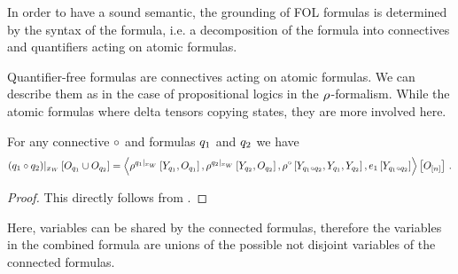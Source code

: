 \label{sec:folConnectiveRepresentation}

In order to have a sound semantic, the grounding of FOL formulas is determined by the syntax of the formula, i.e. a decomposition of the formula into connectives and quantifiers acting on atomic formulas.

Quantifier-free formulas are connectives acting on atomic formulas.
We can describe them as in the case of propositional logics in the $\rho^{}$-formalism.
While the atomic formulas where delta tensors copying states, they are more involved here.



\begin{theorem}
    For any connective $\circ$ and formulas $q_1$ and $q_2$ we have
    \begin{align}
        {(q_1\circ q_2)}|_{x_{W}} \left[O_{q_1}\cup O_{q_2}\right] =
        \left\langle 
            \rho^{{q_1}|_{x_{W}}}\left[Y_{q_1},O_{q_1}\right],
            \rho^{{q_2}|_{x_{W}}}\left[Y_{q_2},O_{q_2}\right],
            \rho^{\circ}\left[Y_{q_1\circ q_2}, Y_{q_1}, Y_{q_2}\right],
            e_1\left[Y_{q_1\circ q_2}\right]
        \right\rangle \left[ O_{[n]} \right] \, .
    \end{align}
\end{theorem}
\begin{proof}
    This directly follows from .
\end{proof}

Here, variables can be shared by the connected formulas, therefore the variables in the combined formula are unions of the possible not disjoint variables of the connected formulas.


